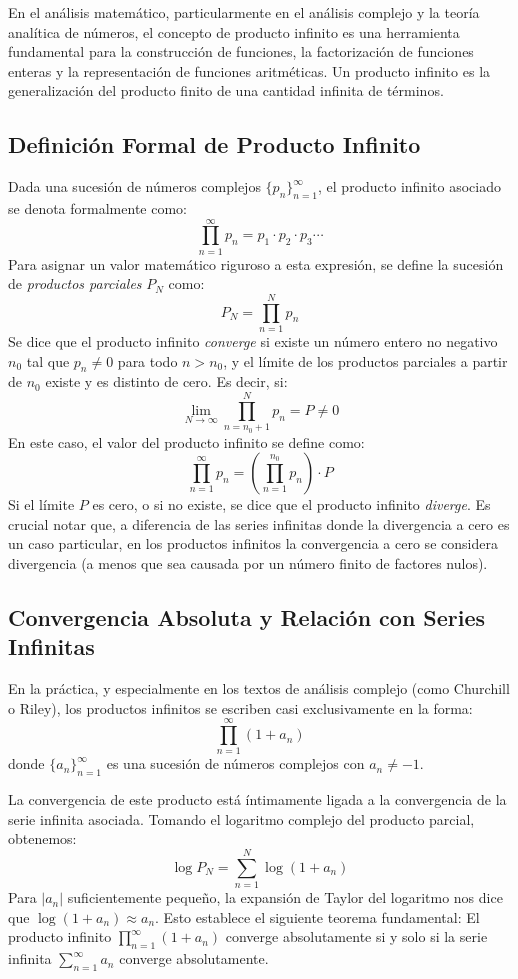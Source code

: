 \documentclass[a4paper]{article}
\begin{document}
En el análisis matemático, particularmente en el análisis complejo y la teoría analítica de números, el concepto de producto infinito es una herramienta fundamental para la construcción de funciones, la factorización de funciones enteras y la representación de funciones aritméticas. Un producto infinito es la generalización del producto finito de una cantidad infinita de términos.

\subsection*{Definición Formal de Producto Infinito}
Dada una sucesión de números complejos $\{p_n\}_{n=1}^{\infty}$, el producto infinito asociado se denota formalmente como:
$$ \prod_{n=1}^{\infty} p_n = p_1 \cdot p_2 \cdot p_3 \cdots $$
Para asignar un valor matemático riguroso a esta expresión, se define la sucesión de \textit{productos parciales} $P_N$ como:
$$ P_N = \prod_{n=1}^{N} p_n $$
Se dice que el producto infinito \textit{converge} si existe un número entero no negativo $n_0$ tal que $p_n \neq 0$ para todo $n > n_0$, y el límite de los productos parciales a partir de $n_0$ existe y es distinto de cero. Es decir, si:
$$ \lim_{N \to \infty} \prod_{n=n_0+1}^{N} p_n = P \neq 0 $$
En este caso, el valor del producto infinito se define como:
$$ \prod_{n=1}^{\infty} p_n = \left( \prod_{n=1}^{n_0} p_n \right) \cdot P $$
Si el límite $P$ es cero, o si no existe, se dice que el producto infinito \textit{diverge}. Es crucial notar que, a diferencia de las series infinitas donde la divergencia a cero es un caso particular, en los productos infinitos la convergencia a cero se considera divergencia (a menos que sea causada por un número finito de factores nulos).

\subsection*{Convergencia Absoluta y Relación con Series Infinitas}
En la práctica, y especialmente en los textos de análisis complejo (como Churchill o Riley), los productos infinitos se escriben casi exclusivamente en la forma:
$$ \prod_{n=1}^{\infty} (1 + a_n) $$
donde $\{a_n\}_{n=1}^{\infty}$ es una sucesión de números complejos con $a_n \neq -1$. 

La convergencia de este producto está íntimamente ligada a la convergencia de la serie infinita asociada. Tomando el logaritmo complejo del producto parcial, obtenemos:
$$ \log P_N = \sum_{n=1}^{N} \log(1 + a_n) $$
Para $|a_n|$ suficientemente pequeño, la expansión de Taylor del logaritmo nos dice que $\log(1 + a_n) \approx a_n$. Esto establece el siguiente teorema fundamental:
El producto infinito $\prod_{n=1}^{\infty} (1 + a_n)$ converge absolutamente si y solo si la serie infinita $\sum_{n=1}^{\infty} a_n$ converge absolutamente. 
\end{document}
